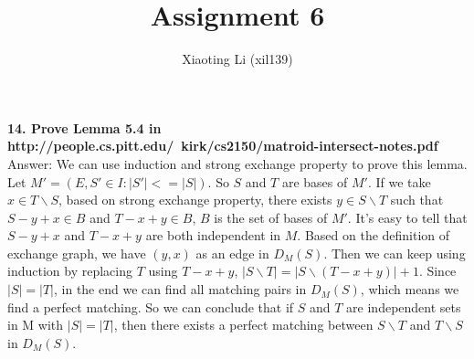 \documentclass{article}
\title{Assignment 6}
\author{Xiaoting Li (xil139)}
\date{}
\begin{document}
\maketitle

\noindent
\textbf{14. Prove Lemma 5.4 in http://people.cs.pitt.edu/~kirk/cs2150/matroid-intersect-notes.pdf} \\ \newline
Answer:
We can use induction and strong exchange property to prove this lemma. Let $M' = (E, {S'\in I: |S'| <= |S|})$. So $S$ and $T$ are bases of $M'$. If we take $x\in T\backslash S$, based on strong exchange property, there exists $y\in S\backslash T$ such that $S - y + x \in B$ and $T - x + y \in B$, $B$ is the set of bases of $M'$. It's easy to tell that $S - y + x$ and $T - x + y$ are both independent in $M$. Based on the definition of exchange graph, we have $(y, x)$ as an edge in $D_M(S)$. Then we can keep using induction by replacing $T$ using $T - x + y$, $|S\backslash T| = |S\backslash (T - x + y)| + 1$. Since $|S| = |T|$, in the end we can find all matching pairs in $D_M(S)$, which means we find a perfect matching. So we can conclude that if $S$ and $T$ are independent sets in M with $|S| = |T|$, then there exists a perfect matching between $S\backslash T$ and $T\backslash S$ in $D_M(S)$. 
\end{document}

